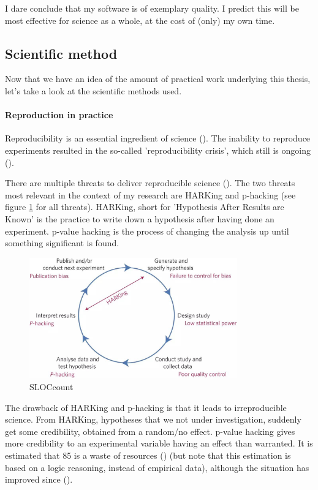 I dare conclude that my software is of exemplary quality. I predict this
will be most effective for science as a whole, at the cost of (only) my own time.

\subsection{Scientific method}

Now that we have an idea of the amount of practical work underlying
this thesis, let's take a look at the scientific methods used.

\paragraph{Reproduction in practice}

Reproducibility is an essential ingredient of science (\cite{mcnutt2014reproducibility}).
The inability to reproduce experiments resulted in the so-called 'reproducibility
crisis', which still is ongoing (\cite{schooler2014metascience}).

There are multiple threats to deliver reproducible 
science (\cite{munafo2017manifesto}).
The two threats most relevant in the context
of my research are HARKing and p-hacking (see 
figure \ref{fig:manifesto} for all threats).
HARKing, short for 'Hypothesis After Results are Known' is the practice
to write down a hypothesis after having done an experiment.
p-value hacking is the process of changing the analysis up until
something significant is found. 

\begin{figure}[]
  \includegraphics[width=0.8\textwidth]{munafo2017manifesto_fig_1.jpg}
  \caption{
    SLOCcount 
  }
  \label{fig:manifesto}
\end{figure}

The drawback of HARKing and p-hacking is that it leads to
irreproducible science. From HARKing, hypotheses that we not under
investigation, suddenly get some credibility, obtained from a
random/no effect. p-value hacking gives more credibility 
to an experimental variable having an effect than warranted.
It is estimated that 85%
is a waste of resources (\cite{chalmers2009avoidable}) (but note
that this estimation is based on a logic reasoning, instead
of empirical data), although the situation has improved 
since (\cite{macleod2014biomedical}). 

